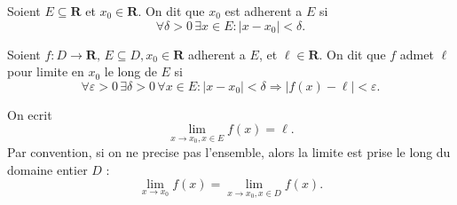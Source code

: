 \begin{definition}
Soient $E\subseteq \mathbf{R}$ et $x_{0}\in \mathbf{R}$. On dit que $x_{0}$ est adherent a $E$ si
$$
\forall\delta>0\,\exists x \in E:|x-x_{0}|<\delta.
$$
\end{definition}
\begin{definition}
Soient $f:D\to \mathbf{R},\, E\subseteq D,x_{0}\in \mathbf{R}$ adherent a $E$, et $\ell \in \mathbf{R}$. On dit que $f$ admet $\ell$ pour limite en $x_{0}$ le long de $E$ si
$$
\forall\varepsilon>0\,\exists\delta>0\,\forall x \in E:|x-x_{0}|<\delta \Rightarrow |f(x)-\ell|<\varepsilon.
$$
\end{definition}
\begin{notation}
On ecrit
$$
\lim_{ x \to x_{0},x \in E } f(x)=\ell.
$$
Par convention, si on ne precise pas l'ensemble, alors la limite est prise le long du domaine entier $D$ :
$$
\lim_{ x \to x_{0} } f(x)=\lim_{ x \to x_{0},x \in D } f(x).
$$
\end{notation}

